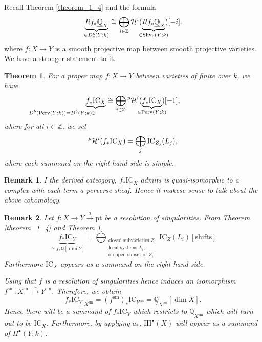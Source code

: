 \documentclass[8pt]{article}
\numberwithin{equation}{section}
\newtheorem{theorem}{Theorem} [section]
\newtheorem{remark}{Remark}[section]
\newcommand{\Z}[0]{\mathbb{Z}}
\newcommand{\Q}[0]{\mathbb{Q}}
\newcommand{\cH}[0]{\mathcal{H}}
\newcommand{\ul}[1]{\underline{#1}}
\newcommand{\IH}[0]{\mathrm{IH}}
\newcommand{\IC}[0]{\mathrm{IC}}
\newcommand{\Shv}[0]{\mathrm{Shv}}
\newcommand{\Perv}[0]{\mathrm{Perv}}
\newcommand{\pt}[0]{\mathrm{pt}}
\begin{document}
Recall Theorem \ref{theorem_1_4} and the formula 
\begin{equation*}
        \underbrace{Rf_*\underline{\Q}_X}_{\in D_c^b(Y;k)} \cong \bigoplus_{i\in\Z}\mathcal{H}^i(\underbrace{Rf_*\underline{\Q}_X}_{\mathmakebox[0pt][c]{\in \Shv_c(Y;k)}})[-i].
    \end{equation*}
where $f:X\to Y$ is a smooth projective map between smooth projective varieties. We have a stronger statement to it.
\begin{theorem}
    For a proper map $f:X\to Y$ between varieties of finite over $k$, we have 
    \begin{equation*}
        \underbrace{f_*\IC_X}_{\mathmakebox[0pt][r]{D^b(\Perv(Y;k))=D^b(Y;k)\ni}} \cong \bigoplus_{i\in\Z}\prescript{p}{}{\cH}^i(\underbrace{f_*\IC_X}_{\mathmakebox[0pt][c]{\in\Perv(Y;k)}})[-1],
    \end{equation*}
    where for all $i\in\Z$, we set 
    \begin{equation*}
        \prescript{p}{}{\cH}^i(f_*\IC_X) = \bigoplus_{j}\IC_{Z_j}(L_j),
    \end{equation*}
    where each summand on the right hand side is simple.
    \label{theorem_2_4}
\end{theorem}

\begin{remark}
    I the derived cateogory, $f_*\IC_X$ admits is quasi-isomorphic to a complex with each term a perverse sheaf. Hence it makese sense to talk about the above cohomology.
\end{remark}

\begin{remark}
    Let $f:X\to Y\stackrel{a}{\to}\pt$ be a resolution of singularities. From Theorem \ref{theorem_1_4} and Theorem \ref{theorem_2_4}, 
    \begin{equation*}
        \underbrace{f_*\IC_Y}_{\cong f_*\ul{\Q}[\dim Y]} = \bigoplus_{\substack{\text{closed subvarieties $Z_i$}\\\text{local systems $L_i$,}\\\text{on open subset of $Z_i$}}}\IC_Z(L_i)[\text{shifts}]
    \end{equation*}
    Furthermore $\IC_X$ appears as a summand on the right hand side.
    \par Using that $f$ is a resolution of singularities hence induces an isomorphism $f^\mathrm{sm}:X^{\mathrm{sm}}\stackrel{\sim}{\to} Y^\mathrm{sm}$. Therefore, we obtain 
    \begin{equation*}
        f_*\IC_Y|_{X^\mathrm{sm}}=(f^{\mathrm{sm}})_*\IC_{Y^\mathrm{sm}}=\ul{\Q}_{X^\mathrm{sm}}[\dim X].
    \end{equation*}
    Hence there will be a summand of $f_*\IC_Y$ which restricts to $\ul{\Q}_{X^\mathrm{sm}}$ which will turn out to be $\IC_X$. Furthermore, by applying $a_*$, $\IH^\bullet(X)$ will appear as a summand of $H^\bullet(Y;k)$.
\end{remark}
\end{document}
